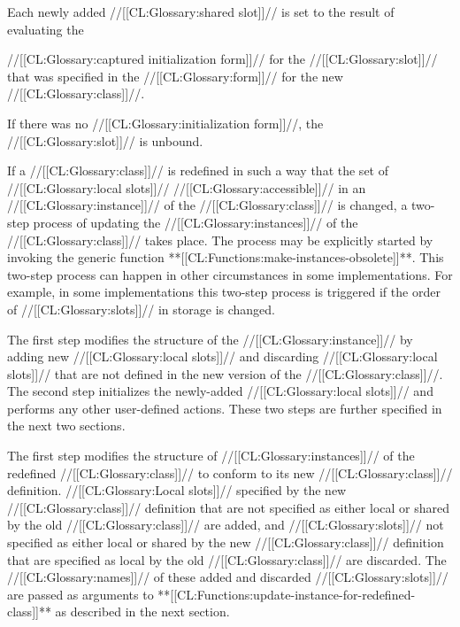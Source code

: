 Each newly added //[[CL:Glossary:shared slot]]// is set to the result of evaluating the

//[[CL:Glossary:captured initialization form]]// for the //[[CL:Glossary:slot]]// that was specified 
in the  //[[CL:Glossary:form]]// for the new //[[CL:Glossary:class]]//.  

If there was no //[[CL:Glossary:initialization form]]//, the //[[CL:Glossary:slot]]// is unbound.

If a //[[CL:Glossary:class]]// is redefined in such a way that the set of
//[[CL:Glossary:local slots]]// //[[CL:Glossary:accessible]]// in an //[[CL:Glossary:instance]]// of the //[[CL:Glossary:class]]// 
is changed, a two-step process of updating the //[[CL:Glossary:instances]]// of the
//[[CL:Glossary:class]]// takes place.  The process may be explicitly started by 
invoking the generic function **[[CL:Functions:make-instances-obsolete]]**.  This
two-step process can happen in other circumstances in some implementations.
For example, in some implementations this two-step process is
triggered if the order of //[[CL:Glossary:slots]]// in storage is changed.

The first step modifies the structure of the //[[CL:Glossary:instance]]// by adding new
//[[CL:Glossary:local slots]]// and discarding //[[CL:Glossary:local slots]]// that are not
defined in the new version of the //[[CL:Glossary:class]]//.  The second step
initializes the newly-added //[[CL:Glossary:local slots]]// and performs any other
user-defined actions. These two steps are further specified
in the next two sections.



The first step modifies the structure of //[[CL:Glossary:instances]]// of the redefined
//[[CL:Glossary:class]]// to conform to its new //[[CL:Glossary:class]]// definition.  
//[[CL:Glossary:Local slots]]// specified
by the new //[[CL:Glossary:class]]// definition that are not specified as either local or
shared by the old //[[CL:Glossary:class]]// are added, and //[[CL:Glossary:slots]]// 
not specified as either
local or shared by the new //[[CL:Glossary:class]]// definition that are specified as
local by the old //[[CL:Glossary:class]]// are discarded. 
The //[[CL:Glossary:names]]// of these added and discarded
//[[CL:Glossary:slots]]// are passed as arguments 
to **[[CL:Functions:update-instance-for-redefined-class]]**
as described in the next section.


